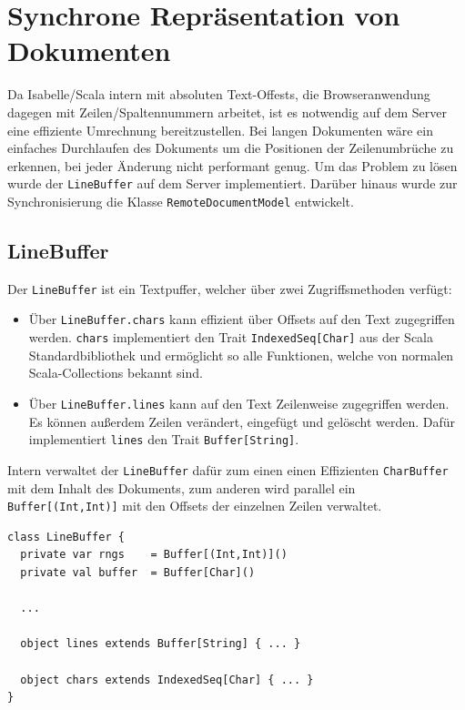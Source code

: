 \clearpage

\section{Synchrone Repräsentation von Dokumenten}
\label{sec:linebuffer}

Da Isabelle/Scala intern mit absoluten Text-Offests, die Browseranwendung dagegen mit
Zeilen/Spaltennummern arbeitet, ist es notwendig auf dem Server eine effiziente Umrechnung
bereitzustellen. Bei langen Dokumenten wäre ein einfaches Durchlaufen des Dokuments um die
Positionen der Zeilenumbrüche zu erkennen, bei jeder Änderung nicht performant genug. Um das Problem
zu lösen wurde der \texttt{LineBuffer} auf dem Server implementiert. Darüber hinaus wurde zur
Synchronisierung die Klasse \texttt{RemoteDocumentModel} entwickelt.

\subsection{LineBuffer}

Der \texttt{LineBuffer} ist ein Textpuffer, welcher über zwei Zugriffsmethoden verfügt:

\begin{itemize}
  \item Über \texttt{LineBuffer.chars} kann effizient über Offsets auf den Text zugegriffen werden. 
  \texttt{chars} implementiert den Trait \texttt{IndexedSeq[Char]} aus der Scala Standardbibliothek
  und ermöglicht so alle Funktionen, welche von normalen Scala-Collections bekannt sind.
  \item Über \texttt{LineBuffer.lines} kann auf den Text Zeilenweise zugegriffen werden. Es können 
  außerdem Zeilen verändert, eingefügt und gelöscht werden. Dafür implementiert \texttt{lines} den 
  Trait \texttt{Buffer[String]}.
\end{itemize}

Intern verwaltet der \texttt{LineBuffer} dafür zum einen einen Effizienten \texttt{CharBuffer} mit
dem Inhalt des Dokuments, zum anderen wird parallel ein \texttt{Buffer[(Int,Int)]} mit den Offsets
der einzelnen Zeilen verwaltet.

\begin{lstlisting}
class LineBuffer {
  private var rngs    = Buffer[(Int,Int)]()  
  private val buffer  = Buffer[Char]()     

  ...
    
  object lines extends Buffer[String] { ... } 
  
  object chars extends IndexedSeq[Char] { ... } 
}
\end{lstlisting}


